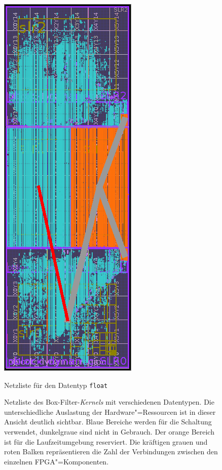 \begin{figure}[htb]
\begin{minipage}{0.45\textwidth}
        \includegraphics{box_res_float.png}
        \caption*{Netzliste für den Datentyp \texttt{float}}
    \end{minipage}
    \caption[Netzliste des synthetisierten Box-Filter-\textit{Kernels} mit
             verschiedenen Datentypen]{Netzliste des Box-Filter-\textit{Kernels}
             mit verschiedenen Datentypen. Die unterschiedliche Auslastung der
             Hardware"=Ressourcen ist in dieser Ansicht deutlich sichtbar. Blaue
             Bereiche werden für die Schaltung verwendet, dunkelgraue sind nicht
             in Gebrauch. Der orange Bereich ist für die Laufzeitumgebung
             reserviert. Die kräftigen grauen und roten Balken repräsentieren
             die Zahl der Verbindungen zwischen den einzelnen
             FPGA"=Komponenten.}
    \label{ergebnisse:box:messung:netzliste}
\end{figure}

